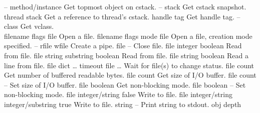 \begin{longtable}{}
\hline
\optableent
	{--}
	{{\bf {}}}
	{method/instance}
	{Get topmost object on cstack.}
\hline
\optableent
	{--}
	{{\bf {}}}
	{stack}
	{Get cstack snapshot.}
\hline
\optableent
	{thread}
	{{\bf {}}}
	{stack}
	{Get a reference to thread's cstack.}
\hline
\optableent
	{handle}
	{{\bf {}}}
	{tag}
	{Get handle tag.}
\hline
\optableent
	{--}
	{{\bf {}}}
	{class}
	{Get vclass.}
\hline \hline
{} \\
\hline \hline
\optableent
	{filename flags}
	{{\bf {}}}
	{file}
	{Open a file.}
\optableent
	{filename flags mode}
	{{\bf {}}}
	{file}
	{Open a file, creation mode specified.}
\hline
\optableent
	{--}
	{{\bf {}}}
	{rfile wfile}
	{Create a pipe.}
\hline
\optableent
	{file}
	{{\bf {}}}
	{--}
	{Close file.}
\hline
\optableent
	{file}
	{{\bf {}}}
	{integer boolean}
	{Read from file.}
\optableent
	{file string}
	{{\bf {}}}
	{substring boolean}
	{Read from file.}
\optableent
	{file}
	{{\bf {}}}
	{string boolean}
	{Read a line from file.}
\hline
\optableent
	{{\lt}file dict \dots{\gt} timeout}
	{{\bf {}}}
	{{\lb}file \dots{\rb}}
	{Wait for file(s) to change status.}
\hline
\optableent
	{file}
	{{\bf {}}}
	{count}
	{Get number of buffered readable bytes.}
\hline
\optableent
	{file}
	{{\bf {}}}
	{count}
	{Get size of I/O buffer.}
\hline
\optableent
	{file count}
	{{\bf {}}}
	{--}
	{Set size of I/O buffer.}
\hline
\optableent
	{file}
	{{\bf {}}}
	{boolean}
	{Get non-blocking mode.}
\hline
\optableent
	{file boolean}
	{{\bf {}}}
	{--}
	{Set non-blocking mode.}
\hline
\optableent
	{file integer/string}
	{{\bf {}}}
	{false}
	{Write to file.}
\optableent
	{file integer/string}
	{{\bf {}}}
	{integer/substring true}
	{Write to file.}
\hline
\optableent
	{string}
	{{\bf {}}}
	{--}
	{Print string to stdout.}
\hline
\optableent
	{obj depth}
	{{\bf {}}}

\end{longtable}
